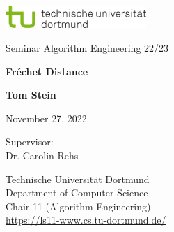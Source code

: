 \begin{titlepage}
    \includegraphics[width=0.4\textwidth]{images/tud_logo_rgb.jpg}

    \begin{center}
        \vspace{3.5cm} \LARGE Seminar Algorithm Engineering 22/23

        \vspace{0.5cm} \huge \textbf{Fréchet Distance}

        \vspace{5cm} \textbf{Tom Stein}

        \vspace{0.25cm} \Large November 27, 2022
    \end{center}

    \vspace{5.2cm} \large \noindent Supervisor: \\
    Dr. Carolin Rehs
    
    \vspace{1cm} \noindent Technische Universität Dortmund \\
    Department of Computer Science \\
    Chair 11 (Algorithm Engineering) \\ 
    \url{https://ls11-www.cs.tu-dortmund.de/}

    
\end{titlepage}
